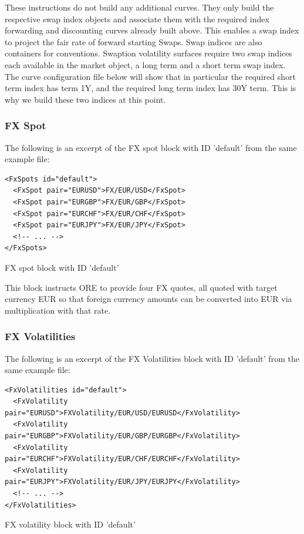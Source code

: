\documentclass[12pt, a4paper]{article}
\begin{document}
These instructions do not build any additional curves. They only build the respective swap index objects and associate
them with the required index forwarding and discounting curves already built above. This enables a swap index to project
the fair rate of forward starting Swaps. Swap indices are also containers for conventions. Swaption volatility surfaces
require two swap indices each available in the market object, a long term and a short term swap index. The curve
configuration file below will show that in particular the required short term index has term 1Y, and the required long
term index has 30Y term. This is why we build these two indices at this point.

\subsubsection{FX Spot}

The following is an excerpt of the FX spot block with ID 'default' from the same example file:

\begin{listing}[H]
\begin{verbatim}
<FxSpots id="default">
  <FxSpot pair="EURUSD">FX/EUR/USD</FxSpot>
  <FxSpot pair="EURGBP">FX/EUR/GBP</FxSpot>
  <FxSpot pair="EURCHF">FX/EUR/CHF</FxSpot>
  <FxSpot pair="EURJPY">FX/EUR/JPY</FxSpot>
  <!-- ... -->
</FxSpots>
\end{verbatim}
\caption{FX spot block with ID 'default'}
\label{lst:fxspot_spec}
\end{listing}

This block instructs ORE to provide four FX quotes, all quoted with target currency EUR so
that foreign currency amounts can be converted into EUR via multiplication with that rate.
 
\subsubsection{FX Volatilities}

The following is an excerpt of the FX Volatilities block with ID 'default' from the same example file:

\begin{listing}[H]
\begin{verbatim}
<FxVolatilities id="default">
  <FxVolatility pair="EURUSD">FXVolatility/EUR/USD/EURUSD</FxVolatility>
  <FxVolatility pair="EURGBP">FXVolatility/EUR/GBP/EURGBP</FxVolatility>
  <FxVolatility pair="EURCHF">FXVolatility/EUR/CHF/EURCHF</FxVolatility>
  <FxVolatility pair="EURJPY">FXVolatility/EUR/JPY/EURJPY</FxVolatility>
  <!-- ... -->
</FxVolatilities>
\end{verbatim}
\caption{FX volatility block with ID 'default'}
\label{lst:fxvol_spec}
\end{listing}
\end{document}
